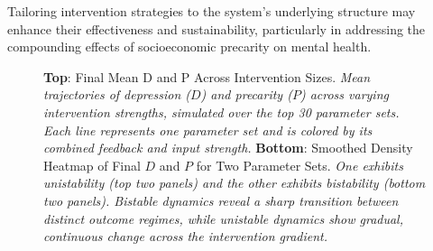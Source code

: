 \documentclass[
]{article}
\begin{document}
Tailoring intervention strategies to the system's underlying structure
may enhance their effectiveness and sustainability, particularly in
addressing the compounding effects of socioeconomic precarity on mental
health.

\begin{figure}


\caption{\label{fig-intervention}\textbf{Top}: Final Mean D and P Across
Intervention Sizes. \emph{Mean trajectories of depression (\(D\)) and
precarity (\(P\)) across varying intervention strengths, simulated over
the top 30 parameter sets. Each line represents one parameter set and is
colored by its combined feedback and input strength.} \textbf{Bottom}:
Smoothed Density Heatmap of Final \(D\) and \(P\) for Two Parameter
Sets. \emph{One exhibits unistability (top two panels) and the other
exhibits bistability (bottom two panels). Bistable dynamics reveal a
sharp transition between distinct outcome regimes, while unistable
dynamics show gradual, continuous change across the intervention
gradient.}}

\end{figure}%
\end{document}
